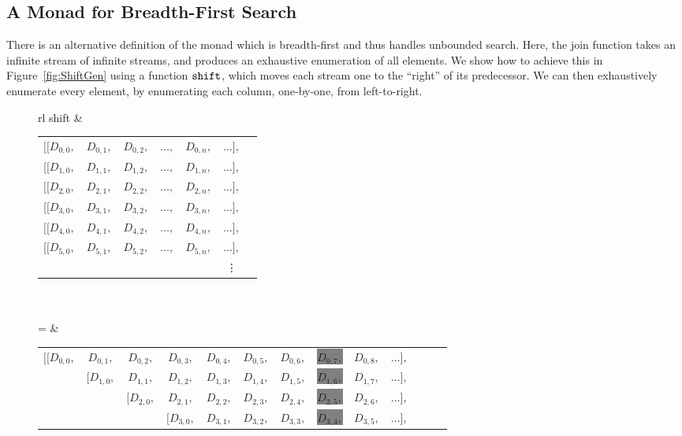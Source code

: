 \subsection{A Monad for Breadth-First Search}\label{sec:StreamMonad}
There is an alternative definition of the monad which is breadth-first and thus handles unbounded search. Here, the join function takes an infinite stream of infinite streams, and produces an exhaustive enumeration of all elements. We show how to achieve this in Figure~\ref{fig:ShiftGen} using a function $\texttt{shift}$, which moves each stream one to the ``right'' of its predecessor. We can then exhaustively enumerate every element, by enumerating each column, one-by-one, from left-to-right. 

\begin{figure}
  \small
  \centering
  \begin{tabular}{rl}
    shift &
    \begin{tabular}{ccccccc}
      $[[D_{0,0},$ & $D_{0,1},$ & $D_{0,2},$ & $\ldots,$ & $D_{0,n},$ & $\ldots],$ \\
      $[[D_{1,0},$ & $D_{1,1},$ & $D_{1,2},$ & $\ldots,$ & $D_{1,n},$ & $\ldots],$ \\
      $[[D_{2,0},$ & $D_{2,1},$ & $D_{2,2},$ & $\ldots,$ & $D_{2,n},$ & $\ldots],$ \\
      $[[D_{3,0},$ & $D_{3,1},$ & $D_{3,2},$ & $\ldots,$ & $D_{3,n},$ & $\ldots],$ \\
      $[[D_{4,0},$ & $D_{4,1},$ & $D_{4,2},$ & $\ldots,$ & $D_{4,n},$ & $\ldots],$ \\
      $[[D_{5,0},$ & $D_{5,1},$ & $D_{5,2},$ & $\ldots,$ & $D_{5,n},$ & $\ldots],$ \\
      & & & & & \vdots
    \end{tabular}\\\\
    = &
    \begin{tabular}{ccccccccccccc}
      $[[D_{0,0},$ & $D_{0,1},$ & $D_{0,2},$ & $D_{0,3},$ & $D_{0,4},$ & $D_{0,5},$ & $D_{0,6},$ & \colorbox{gray}{$D_{0,7},$} & $D_{0,8},$ & $\ldots],$\\
      & $[D_{1,0},$ & $D_{1,1},$ & $D_{1,2},$ & $D_{1,3},$ & $D_{1,4},$ & $D_{1,5},$ & \colorbox{gray}{$D_{1,6},$} & $D_{1,7},$ &  $\ldots],$\\
      && $[D_{2,0},$ & $D_{2,1},$ & $D_{2,2},$ & $D_{2,3},$ & $D_{2,4},$ & \colorbox{gray}{$D_{2,5},$} & $D_{2,6},$ & $\ldots],$\\
      &&& $[D_{3,0},$ & $D_{3,1},$ & $D_{3,2},$ & $D_{3,3},$ & \colorbox{gray}{$D_{3,4},$} & $D_{3,5},$ & $\ldots],$\\

\end{tabular}
\end{tabular}
\end{figure}
